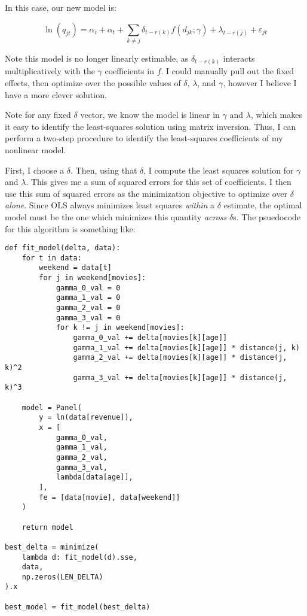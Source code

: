 \documentclass{article}
\begin{document}
In this case, our new model is:

$$\ln(q_{jt}) = \alpha_i + \alpha_t + \sum_{k \neq j} \delta_{t - r(k)} f(d_{jk}; \gamma) + \lambda_{t - r(j)} + \varepsilon_{jt}$$

Note this model is no longer linearly estimable, as $\delta_{t - r(k)}$ interacts multiplicatively with the $\gamma$ coefficients in $f$. I could manually pull out the fixed effects, then optimize over the possible values of $\delta$, $\lambda$, and $\gamma$, however I believe I have a more clever solution.

Note for any fixed $\delta$ vector, we know the model is linear in $\gamma$ and $\lambda$, which makes it easy to identify the least-squares solution using matrix inversion. Thus, I can perform a two-step procedure to identify the least-squares coefficients of my nonlinear model.

First, I choose a $\delta$. Then, using that $\delta$, I compute the least squares solution for $\gamma$ and $\lambda$. This gives me a sum of squared errors for this set of coefficients. I then use this sum of squared errors as the minimization objective to optimize over \emph{$\delta$ alone}. Since OLS always minimizes least squares \emph{within} a $\delta$ estimate, the optimal model must be the one which minimizes this quantity \emph{across} $\delta$s. The psuedocode for this algorithm is something like:

\begin{verbatim}
def fit_model(delta, data):
    for t in data:
        weekend = data[t]
        for j in weekend[movies]:
            gamma_0_val = 0
            gamma_1_val = 0
            gamma_2_val = 0
            gamma_3_val = 0
            for k != j in weekend[movies]:
                gamma_0_val += delta[movies[k][age]]
                gamma_1_val += delta[movies[k][age]] * distance(j, k)
                gamma_2_val += delta[movies[k][age]] * distance(j, k)^2
                gamma_3_val += delta[movies[k][age]] * distance(j, k)^3

    model = Panel(
        y = ln(data[revenue]),
        x = [
            gamma_0_val,
            gamma_1_val,
            gamma_2_val,
            gamma_3_val,
            lambda[data[age]],
        ],
        fe = [data[movie], data[weekend]]
    )

    return model

best_delta = minimize(
    lambda d: fit_model(d).sse, 
    data, 
    np.zeros(LEN_DELTA)
).x

best_model = fit_model(best_delta)
\end{verbatim}
\end{document}

